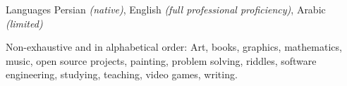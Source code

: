 \documentclass[10pt,a4paper]{article}
\begin{document}
\headedsection{}
{Languages}{}
{Persian \textit{(native)}, English \textit{(full professional proficiency)}, Arabic \textit{(limited)}}


\spacedhrule{1.6em}{-0.4em}



\inlineheadsection
{Non-exhaustive and in alphabetical order:}
{
    Art,
    books,
    graphics,
    mathematics,
    music,
    open source projects,
    painting,
    problem solving,
    riddles,
    software engineering,
    studying,
    teaching,
    video games,
    writing.
}
{}
\end{document}
